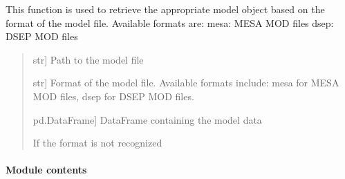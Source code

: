 \documentclass[letterpaper,10pt,english]{sphinxmanual}
\begin{document}
\begin{fulllineitems}
\label{\detokenize{CoolDwarf.model:CoolDwarf.model.model.get_model}}
\pysigstartsignatures
{}
\pysigstopsignatures
\sphinxAtStartPar
This function is used to retrieve the appropriate model object based on the format of the model file.
Available formats are:
\sphinxhyphen{} mesa: MESA MOD files
\sphinxhyphen{} dsep: DSEP MOD files
\begin{quote}\begin{description}
\begin{description}
\sphinxlineitem{\sphinxstylestrong{path}}{[}str{]}
\sphinxAtStartPar
Path to the model file

\sphinxlineitem{\sphinxstylestrong{format}}{[}str{]}
\sphinxAtStartPar
Format of the model file. Available formats include: mesa for MESA MOD files, dsep for DSEP MOD files.

\end{description}

\begin{description}
\sphinxlineitem{\sphinxstylestrong{model}}{[}pd.DataFrame{]}
\sphinxAtStartPar
DataFrame containing the model data

\end{description}

\begin{description}
\sphinxAtStartPar
If the format is not recognized

\end{description}

\end{description}\end{quote}

\end{fulllineitems}



\paragraph{Module contents}
\label{\detokenize{CoolDwarf.model:module-CoolDwarf.model}}\label{\detokenize{CoolDwarf.model:module-contents}}
\sphinxstepscope
\end{document}
